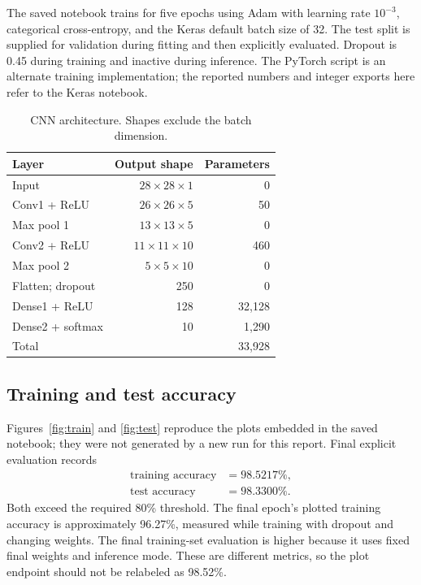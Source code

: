 \documentclass[10pt,twocolumn,letterpaper]{article}
\begin{document}
The saved notebook trains for five epochs using Adam with learning rate
$10^{-3}$, categorical cross-entropy, and the Keras default batch size of
32. The test split is supplied for validation during fitting and then
explicitly evaluated. Dropout is 0.45 during training and inactive during
inference. The PyTorch script is an alternate training implementation;
the reported numbers and integer exports here refer to the Keras notebook.

\begin{table}[t]\centering\small
\caption{CNN architecture. Shapes exclude the batch dimension.}\label{tab:cnn}
\begin{tabular}{lrr}\toprule
Layer & Output shape & Parameters\\\midrule
Input & $28\times28\times1$ & 0\\
Conv1 + ReLU & $26\times26\times5$ & 50\\
Max pool 1 & $13\times13\times5$ & 0\\
Conv2 + ReLU & $11\times11\times10$ & 460\\
Max pool 2 & $5\times5\times10$ & 0\\
Flatten; dropout & 250 & 0\\
Dense1 + ReLU & 128 & 32,128\\
Dense2 + softmax & 10 & 1,290\\\midrule
Total & & 33,928\\\bottomrule
\end{tabular}
\end{table}

\subsection{Training and test accuracy}
Figures~\ref{fig:train} and \ref{fig:test} reproduce the plots embedded in the
saved notebook; they were not generated by a new run for this report.
Final explicit evaluation records
\begin{align*}
\text{training accuracy}&=98.5217\%,\\
\text{test accuracy}&=98.3300\%.
\end{align*}
Both exceed the required 80\% threshold. The final epoch's plotted training
accuracy is approximately 96.27\%, measured while training with dropout and
changing weights. The final training-set evaluation is higher because it
uses fixed final weights and inference mode. These are different metrics,
so the plot endpoint should not be relabeled as 98.52\%.
\end{document}
